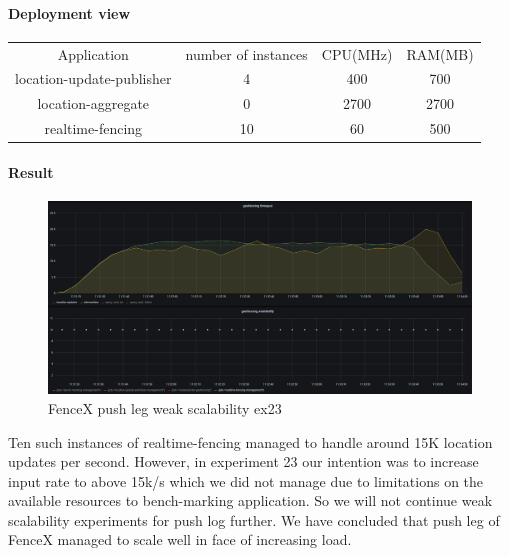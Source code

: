 \documentclass[a4]{report}
\begin{document}
        \paragraph{Deployment view}
        \begin{center}
            \begin{tabular}{ c c c c }
                Application               & number of instances & CPU(MHz) & RAM(MB) \\
                location-update-publisher & 4                   & 400      & 700     \\
                location-aggregate        & 0                   & 2700     & 2700    \\
                realtime-fencing          & 10                  & 60       & 500     \\
            \end{tabular}
        \end{center}

        \paragraph{Result}
        \begin{figure}[ht]
            \caption{FenceX push leg weak scalability ex23}
            \label{fig:ex23}
            \includegraphics[scale=0.4]{images/evaluation/ex23-benchmarking-ongoing-2per2sec.png}
        \end{figure}
        Ten such instances of realtime-fencing managed to handle around 15K location updates per second.
        However, in experiment 23 our intention was to increase input rate to above 15k/s which we did not manage due to
        limitations on the available resources to bench-marking application.
        So we will not continue weak scalability experiments for push log further.
        We have concluded that push leg of FenceX managed to scale well in face of increasing load.
\end{document}
